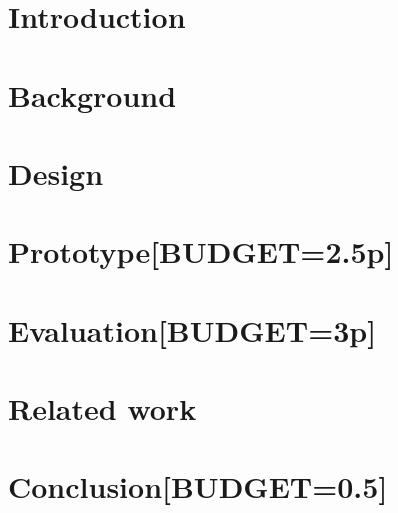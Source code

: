 \section{Introduction}
\label{sec:intro}




\section{Background}
\label{sec:background}


\section{\tcpls Design}
\label{sec:background-design}




\section{\tcpls Prototype[BUDGET=2.5p]}
\label{sec:prototype}



\section{\tcpls Evaluation[BUDGET=3p]}
\label{sec:evaluation}



\section{Related work}
\label{sec:related}


\section{Conclusion[BUDGET=0.5]}
\label{sec:conclusion}




%



